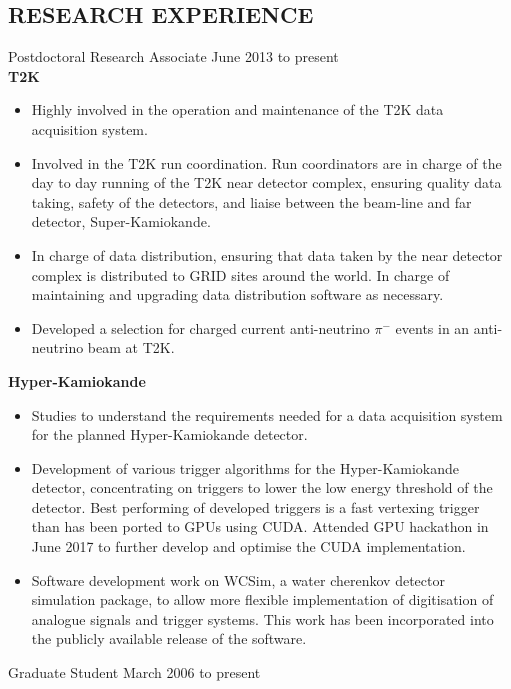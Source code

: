 \documentclass[margin]{res}
\begin{document}
\begin{resume}
\section{RESEARCH EXPERIENCE}

Postdoctoral Research Associate \hfill June 2013 to present\\

\textbf{T2K}

\begin{itemize}
\item Highly involved in the operation and maintenance of the T2K data acquisition system.
\item Involved in the T2K run coordination. Run coordinators are in charge of the day to day running of the T2K near detector complex, ensuring quality data taking, safety of the detectors, and liaise between the beam-line and far detector, Super-Kamiokande.
\item In charge of data distribution, ensuring that data taken by the near detector complex is distributed to GRID sites around the world.  In charge of maintaining and upgrading data distribution software as necessary.
\item Developed a selection for charged current anti-neutrino $\pi^{-}$ events in an anti-neutrino beam at T2K.
\end{itemize}

\textbf{Hyper-Kamiokande}

\begin{itemize}
\item Studies to understand the requirements needed for a data acquisition system for the planned Hyper-Kamiokande detector.
\item Development of various trigger algorithms for the Hyper-Kamiokande detector, concentrating on triggers to lower the low energy threshold of the detector.  Best performing of developed triggers is a fast vertexing trigger than has been ported to GPUs using CUDA.  Attended GPU hackathon in June 2017 to further develop and optimise the CUDA implementation.
\item Software development work on WCSim, a water cherenkov detector simulation package, to allow more flexible implementation of digitisation of analogue signals and trigger systems.  This work has been incorporated into the publicly available release of the software.
\end{itemize}

Graduate Student \hfill March 2006 to present\\



\end{resume}
\end{document}
